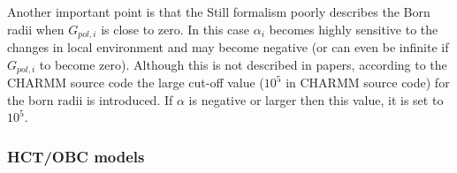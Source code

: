 \documentclass[11pt]{book}
\begin{document}
Another important point is that the Still formalism poorly describes the Born radii when $G_{pol,i}$ is close to zero. In this case $\alpha_{i}$ becomes highly sensitive to the changes in local environment and may become negative (or can even be infinite if $G_{pol,i}$ to become zero). Although this is not described in papers, according to the CHARMM source code the large cut-off value ($10^{5}$ in CHARMM source code) for the born radii is introduced. If $\alpha$ is negative or larger then this value, it is set to $10^{5}$.


\subsubsection{HCT/OBC models}
\end{document}
